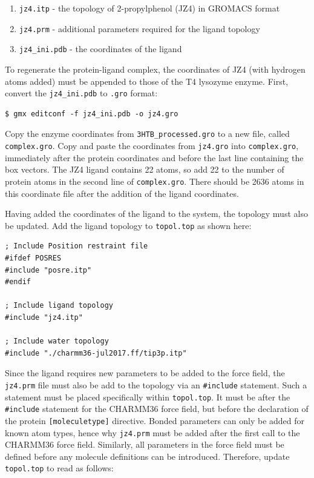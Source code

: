 \documentclass[9pt,tutorial]{livecoms}
\begin{document}
\begin{enumerate}
	\item \texttt{jz4.itp} - the topology of 2-propylphenol (JZ4) in GROMACS format
	\item \texttt{jz4.prm} - additional parameters required for the ligand topology
	\item \texttt{jz4\_ini.pdb} - the coordinates of the ligand
\end{enumerate}

To regenerate the protein-ligand complex, the coordinates of JZ4 (with hydrogen atoms added) must be appended to those of the T4 lysozyme enzyme. First, convert the \texttt{jz4\_ini.pdb} to \texttt{.gro} format:

\begin{verbatim}
$ gmx editconf -f jz4_ini.pdb -o jz4.gro
\end{verbatim}

Copy the enzyme coordinates from \texttt{3HTB\_processed.gro} to a new file, called \texttt{complex.gro}. Copy and paste the coordinates from \texttt{jz4.gro} into \texttt{complex.gro}, immediately after the protein coordinates and before the last line containing the box vectors. The JZ4 ligand contains 22 atoms, so add 22 to the number of protein atoms in the second line of \texttt{complex.gro}. There should be 2636 atoms in this coordinate file after the addition of the ligand coordinates.

Having added the coordinates of the ligand to the system, the topology must also be updated. Add the ligand topology to \texttt{topol.top} as shown here:

\begin{verbatim}
; Include Position restraint file
#ifdef POSRES
#include "posre.itp"
#endif

; Include ligand topology
#include "jz4.itp"

; Include water topology
#include "./charmm36-jul2017.ff/tip3p.itp"
\end{verbatim}

Since the ligand requires new parameters to be added to the force field, the \texttt{jz4.prm} file must also be add to the topology via an \texttt{\#include} statement. Such a statement must be placed specifically within \texttt{topol.top}. It must be after the \texttt{\#include} statement for the CHARMM36 force field, but before the declaration of the protein \texttt{[moleculetype]} directive. Bonded parameters can only be added for known atom types, hence why \texttt{jz4.prm} must be added after the first call to the CHARMM36 force field. Similarly, all parameters in the force field must be defined before any molecule definitions can be introduced. Therefore, update \texttt{topol.top} to read as follows:
\end{document}
